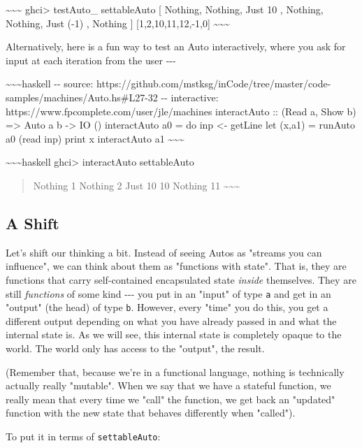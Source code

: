 \documentclass[]{article}
\begin{document}
\textasciitilde{}\textasciitilde{}\textasciitilde{} ghci\textgreater{}
testAuto\_ settableAuto {[} Nothing, Nothing, Just 10 , Nothing, Nothing, Just
(-1) , Nothing {]} {[}1,2,10,11,12,-1,0{]}
\textasciitilde{}\textasciitilde{}\textasciitilde{}

Alternatively, here is a fun way to test an Auto interactively, where you ask
for input at each iteration from the user -\/-\/-

\textasciitilde{}\textasciitilde{}\textasciitilde{}haskell -\/- source:
https://github.com/mstksg/inCode/tree/master/code-samples/machines/Auto.hs\#L27-32
-\/- interactive: https://www.fpcomplete.com/user/jle/machines interactAuto ::
(Read a, Show b) =\textgreater{} Auto a b -\textgreater{} IO () interactAuto a0
= do inp \textless{}- getLine let (x,a1) = runAuto a0 (read inp) print x
interactAuto a1 \textasciitilde{}\textasciitilde{}\textasciitilde{}

\textasciitilde{}\textasciitilde{}\textasciitilde{}haskell ghci\textgreater{}
interactAuto settableAuto

\begin{quote}
Nothing 1 Nothing 2 Just 10 10 Nothing 11
\textasciitilde{}\textasciitilde{}\textasciitilde{}
\end{quote}

\subsection{A Shift}

Let's shift our thinking a bit. Instead of seeing Autos as "streams you can
influence", we can think about them as "functions with state". That is, they are
functions that carry self-contained encapsulated state \emph{inside} themselves.
They are still \emph{functions} of some kind -\/-\/- you put in an "input" of
type \texttt{a} and get in an "output" (the head) of type \texttt{b}. However,
every "time" you do this, you get a different output depending on what you have
already passed in and what the internal state is. As we will see, this internal
state is completely opaque to the world. The world only has access to the
"output", the result.

(Remember that, because we're in a functional language, nothing is technically
actually really "mutable". When we say that we have a stateful function, we
really mean that every time we "call" the function, we get back an "updated"
function with the new state that behaves differently when "called").

To put it in terms of \texttt{settableAuto}:
\end{document}

